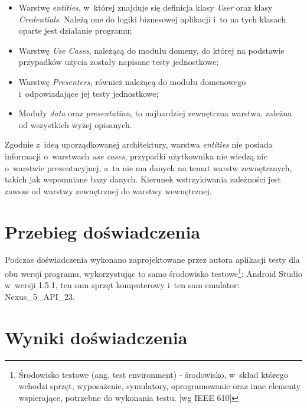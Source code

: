 \begin{itemize}
\item
Warstwę \textit{entities}, w~której znajduje się definicja klasy \textit{User} oraz klasy \textit{Credentials}. Należą one do logiki biznesowej aplikacji i~to na tych klasach oparte jest działanie programu; 

\item
Warstwę \textit{Use Cases}, należącą do modułu domeny, do której na podstawie przypadków użycia zostały napisane testy jednostkowe;

\item
Warstwę \textit{Presenters}, również należącą do modułu domenowego i~odpowiadające jej testy jednostkowe; 

\item
Moduły \textit{data} oraz \textit{presentation}, to najbardziej zewnętrzna warstwa, zależna od wszystkich wyżej opisanych. 
\end{itemize}

Zgodnie z~ideą uporządkowanej architektury, warstwa \textit{entities} nie posiada informacji o~warstwach \textit{use cases}, przypadki użytkownika nie wiedzą nic o~warstwie prezentacyjnej, a~ta nie ma danych na temat warstw zewnętrznych, takich jak wspomniane bazy danych. Kierunek wstrzykiwania zależności jest zawsze od warstwy zewnętrznej do warstwy wewnętrznej.

\section{Przebieg doświadczenia}
Podczas doświadczenia wykonano zaprojektowane przez autora aplikacji testy dla obu wersji programu, wykorzystując to samo środowisko testowe\footnote{Środowisko testowe (ang. test environment) - środowisko, w~skład którego wchodzi sprzęt, wyposażenie, symulatory, oprogramowanie oraz inne elementy wspierające, potrzebne do wykonania testu. [wg IEEE 610]}: Android Studio w~wersji 1.5.1, ten sam sprzęt komputerowy i~ten sam emulator: Nexus\_5\_API\_23.

\section{Wyniki doświadczenia}
\label{wyniki_doswiadczenia}

